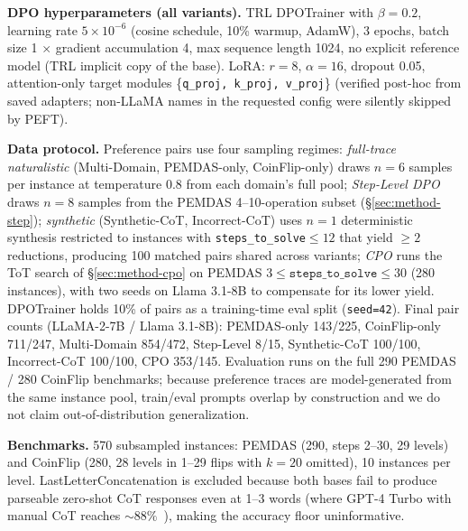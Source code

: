 \documentclass{article}
\begin{document}
\textbf{DPO hyperparameters (all variants).} TRL DPOTrainer with $\beta{=}0.2$, learning rate $5{\times}10^{-6}$ (cosine schedule, 10\% warmup, AdamW), 3 epochs, batch size 1 $\times$ gradient accumulation 4, max sequence length 1024, no explicit reference model (TRL implicit copy of the base). LoRA: $r{=}8$, $\alpha{=}16$, dropout 0.05, attention-only target modules \{\texttt{q\_proj, k\_proj, v\_proj}\} (verified post-hoc from saved adapters; non-LLaMA names in the requested config were silently skipped by PEFT).

\textbf{Data protocol.} Preference pairs use four sampling regimes: \emph{full-trace naturalistic} (Multi-Domain, PEMDAS-only, CoinFlip-only) draws $n{=}6$ samples per instance at temperature 0.8 from each domain's full pool; \emph{Step-Level DPO} draws $n{=}8$ samples from the PEMDAS 4--10-operation subset (§\ref{sec:method-step}); \emph{synthetic} (Synthetic-CoT, Incorrect-CoT) uses $n{=}1$ deterministic synthesis restricted to instances with \texttt{steps\_to\_solve}${\le}12$ that yield ${\ge}2$ reductions, producing 100 matched pairs shared across variants; \emph{CPO} runs the ToT search of §\ref{sec:method-cpo} on PEMDAS $3{\le}\texttt{steps\_to\_solve}{\le}30$ (280 instances), with two seeds on Llama 3.1-8B to compensate for its lower yield. DPOTrainer holds 10\% of pairs as a training-time eval split (\texttt{seed=42}). Final pair counts (LLaMA-2-7B / Llama 3.1-8B): PEMDAS-only 143/225, CoinFlip-only 711/247, Multi-Domain 854/472, Step-Level 8/15, Synthetic-CoT 100/100, Incorrect-CoT 100/100, CPO 353/145. Evaluation runs on the full 290 PEMDAS / 280 CoinFlip benchmarks; because preference traces are model-generated from the same instance pool, train/eval prompts overlap by construction and we do not claim out-of-distribution generalization.

\textbf{Benchmarks.} 570 subsampled instances: PEMDAS (290, steps 2--30, 29 levels) and CoinFlip (280, 28 levels in 1--29 flips with $k{=}20$ omitted), 10 instances per level. LastLetterConcatenation is excluded because both bases fail to produce parseable zero-shot CoT responses even at 1--3 words (where GPT-4 Turbo with manual CoT reaches ${\sim}88\%$~\cite{stechly2024thoughtlessness}), making the accuracy floor uninformative.
\end{document}
